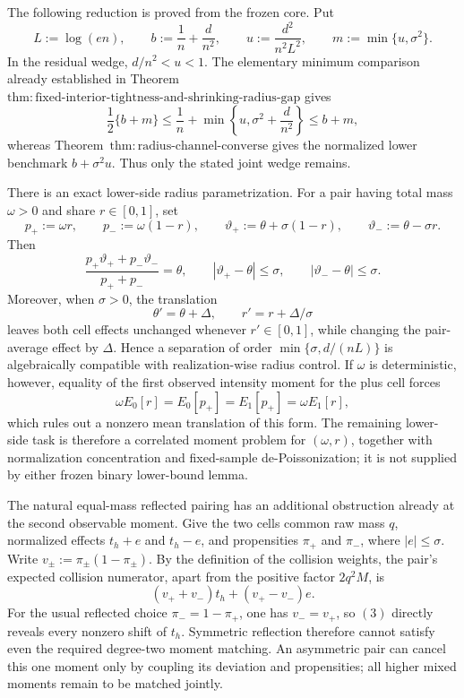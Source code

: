 The following reduction is proved from the frozen core.  Put
\[
 L:=\log(en),\qquad b:=\frac1n+\frac d{n^2},\qquad
 u:=\frac{d^2}{n^2L^2},\qquad m:=\min\{u,\sigma^2\}.
\]
In the residual wedge, \(d/n^2<u<1\).  The elementary minimum comparison already established in Theorem~\(\mathrm{thm:fixed\text{-}interior\text{-}tightness\text{-}and\text{-}shrinking\text{-}radius\text{-}gap}\) gives
\[
 \frac12\{b+m\}
 \le \frac1n+\min\left\{u,\sigma^2+\frac d{n^2}\right\}
 \le b+m,
\]
whereas Theorem~\(\mathrm{thm:radius\text{-}channel\text{-}converse}\) gives the normalized lower benchmark \(b+\sigma^2u\).  Thus only the stated joint wedge remains.

There is an exact lower-side radius parametrization.  For a pair having total mass \(\omega>0\) and share \(r\in[0,1]\), set
\[
 p_+:=\omega r,\qquad p_-:=\omega(1-r),
 \qquad
 \vartheta_+:=\theta+\sigma(1-r),\qquad
 \vartheta_-:=\theta-\sigma r.
\]
Then
\[
 \frac{p_+\vartheta_++p_-\vartheta_-}{p_++p_-}=\theta,
 \qquad
 |\vartheta_+-\theta|\le\sigma,\qquad
 |\vartheta_--\theta|\le\sigma.
\]
Moreover, when \(\sigma>0\), the translation
\[
 \theta'=\theta+\Delta,\qquad r'=r+\Delta/\sigma
\]
leaves both cell effects unchanged whenever \(r'\in[0,1]\), while changing the pair-average effect by \(\Delta\).  Hence a separation of order \(\min\{\sigma,d/(nL)\}\) is algebraically compatible with realization-wise radius control.  If \(\omega\) is deterministic, however, equality of the first observed intensity moment for the plus cell forces
\[
 \omega E_0[r]=E_0[p_+]=E_1[p_+]=\omega E_1[r],
\]
which rules out a nonzero mean translation of this form.  The remaining lower-side task is therefore a correlated moment problem for \((\omega,r)\), together with normalization concentration and fixed-sample de-Poissonization; it is not supplied by either frozen binary lower-bound lemma.

The natural equal-mass reflected pairing has an additional obstruction already at the second observable moment.  Give the two cells common raw mass \(q\), normalized effects \(t_h+e\) and \(t_h-e\), and propensities \(\pi_+\) and \(\pi_-\), where \(|e|\le\sigma\).  Write \(v_\pm:=\pi_\pm(1-\pi_\pm)\).  By the definition of the collision weights, the pair's expected collision numerator, apart from the positive factor \(2q^2M\), is
\[
 (v_++v_-)t_h+(v_+-v_-)e.
\tag{3}
\]
For the usual reflected choice \(\pi_-=1-\pi_+\), one has \(v_-=v_+\), so \((3)\) directly reveals every nonzero shift of \(t_h\).  Symmetric reflection therefore cannot satisfy even the required degree-two moment matching.  An asymmetric pair can cancel this one moment only by coupling its deviation and propensities; all higher mixed moments remain to be matched jointly.

